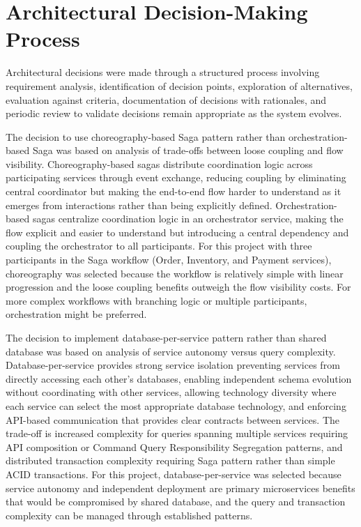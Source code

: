 \section{Architectural Decision-Making Process}

Architectural decisions were made through a structured process involving requirement analysis, identification of decision points, exploration of alternatives, evaluation against criteria, documentation of decisions with rationales, and periodic review to validate decisions remain appropriate as the system evolves.

The decision to use choreography-based Saga pattern rather than orchestration-based Saga was based on analysis of trade-offs between loose coupling and flow visibility. Choreography-based sagas distribute coordination logic across participating services through event exchange, reducing coupling by eliminating central coordinator but making the end-to-end flow harder to understand as it emerges from interactions rather than being explicitly defined. Orchestration-based sagas centralize coordination logic in an orchestrator service, making the flow explicit and easier to understand but introducing a central dependency and coupling the orchestrator to all participants. For this project with three participants in the Saga workflow (Order, Inventory, and Payment services), choreography was selected because the workflow is relatively simple with linear progression and the loose coupling benefits outweigh the flow visibility costs. For more complex workflows with branching logic or multiple participants, orchestration might be preferred.

The decision to implement database-per-service pattern rather than shared database was based on analysis of service autonomy versus query complexity. Database-per-service provides strong service isolation preventing services from directly accessing each other's databases, enabling independent schema evolution without coordinating with other services, allowing technology diversity where each service can select the most appropriate database technology, and enforcing API-based communication that provides clear contracts between services. The trade-off is increased complexity for queries spanning multiple services requiring API composition or Command Query Responsibility Segregation patterns, and distributed transaction complexity requiring Saga pattern rather than simple ACID transactions. For this project, database-per-service was selected because service autonomy and independent deployment are primary microservices benefits that would be compromised by shared database, and the query and transaction complexity can be managed through established patterns.

